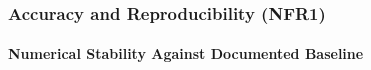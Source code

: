 \documentclass[12pt, titlepage]{article}
\begin{document}





\subsubsection{Accuracy and Reproducibility (NFR1)}
		
\paragraph{Numerical Stability Against Documented Baseline}
\end{document}
